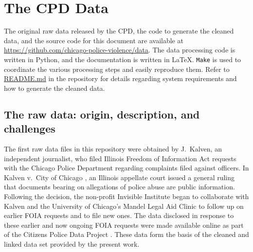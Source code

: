\section{The CPD Data} \label{sec:data}

The original raw data released by the CPD, the code to generate the cleaned
data, and the source code for this document are available at
\url{https://github.com/chicago-police-violence/data}.  The data processing
code is written in Python, and the documentation is written in \LaTeX.
\texttt{Make} is used to coordinate the various processing steps and easily
reproduce them.  Refer to \url{README.md} in the repository for details
regarding system requirements and how to generate the cleaned data.

\subsection{The raw data: origin, description, and challenges}

The first raw data files in this repository were obtained by J.~Kalven, an 
independent journalist, who filed Illinois Freedom of Information Act requests with 
the Chicago Police Department regarding complaints filed against officers. 
In Kalven v.~City of Chicago \cite{kalven2014}, an Illinois appellate court issued
a general ruling that documents bearing on allegations of
police abuse are public information. Following 
the decision, the non-profit
Invisible Institute began to collaborate with Kalven 
and the University of Chicago's Mandel Legal Aid
Clinic to follow up on earlier FOIA requests and to file new ones. The data
disclosed in response to these earlier and now ongoing FOIA requests were made available
online as part of the Citizens Police Data Project \cite{cpdp}.
These data form the basis of the cleaned and linked data set provided by the present work.

